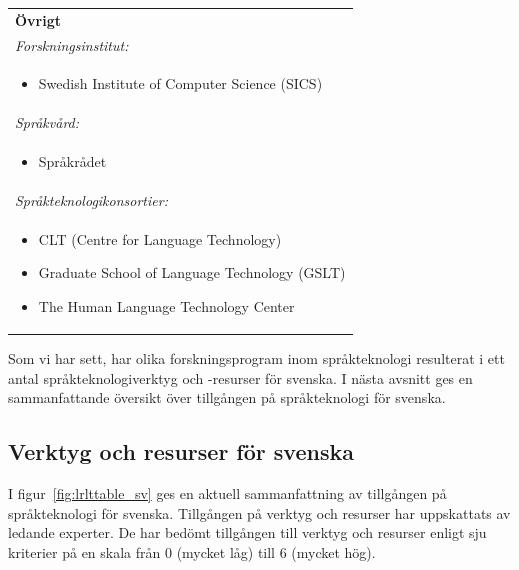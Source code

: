 \begin{multicols}{2}
\begin{minipage}[t]{\linewidth}
\begin{tabular}{p{}}
{\textbf{Övrigt}} \\
{\emph{Forskningsinstitut:}} \\
\begin{itemize} \item \vspace{-20pt} Swedish Institute of Computer Science (SICS) \vspace{-10pt}  \end{itemize} \\
{\emph{Språkvård:}} \\
\begin{itemize} \item \vspace{-20pt} Språkrådet \vspace{-10pt}  \end{itemize} \\
{\emph{Språkteknologikonsortier:}} \\
\parbox[b]{0.9\columnwidth}{%
\begin{itemize}
\item CLT (Centre for Language Technology)
\item Graduate School of Language Tech\-nology (GSLT)
\item The Human Language Technology \mbox{Center}
\end{itemize}} \\ \addlinespace \addlinespace \addlinespace
\end{tabular}
\end{minipage}


Som vi har sett, har olika forskningsprogram inom språkteknologi
resulterat i ett antal språkteknologiverktyg och -resurser för
svenska. I nästa avsnitt ges en sammanfattande översikt över
tillgången på språkteknologi för svenska.

\subsection{Verktyg och resurser för svenska}\label{section:LTavailability_sv}

I figur~\ref{fig:lrlttable_sv} ges en aktuell sammanfattning av
tillgången på språkteknologi för svenska. Tillgången på verktyg och
resurser har uppskattats av ledande experter. De har bedömt tillgången
till verktyg och resurser enligt sju kriterier på en skala från 0
(mycket låg) till 6 (mycket hög).


\end{multicols}
